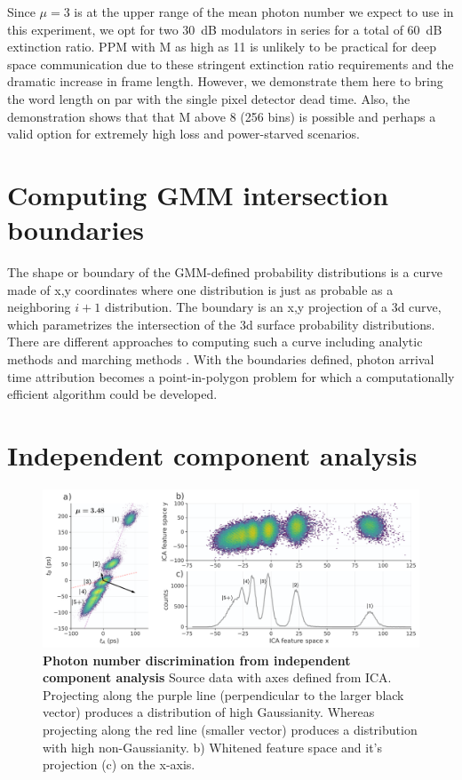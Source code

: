 \documentclass[11pt]{caltech_thesis} %
\begin{document}
Since $\mu=3$ is at the upper range of the mean photon number we expect to use in this experiment, we opt for two 30~dB modulators in series for a total of 60~dB extinction ratio. PPM with M as high as 11 is unlikely to be practical for deep space communication due to these stringent extinction ratio requirements and the dramatic increase in frame length. However, we demonstrate them here to bring the word length on par with the single pixel detector dead time. Also, the demonstration shows that that M above 8 (256 bins) is possible and perhaps a valid option for extremely high loss and power-starved scenarios.

\hypertarget{computing-gmm-intersection-boundaries}{%
\section{Computing GMM intersection boundaries}\label{computing-gmm-intersection-boundaries}}

The shape or boundary of the GMM-defined probability distributions is a curve made of x,y coordinates where one distribution is just as probable as a neighboring $i+1$ distribution. The boundary is an x,y projection of a 3d curve, which parametrizes the intersection of the 3d surface probability distributions. There are different approaches to computing such a curve including analytic methods and marching methods \autocite{Bajaj1988,Shankar1997}. With the boundaries defined, photon arrival time attribution becomes a point-in-polygon problem for which a computationally efficient algorithm could be developed.

\hypertarget{independent-component-analysis}{%
\section{Independent component analysis}\label{independent-component-analysis}}

\hypertarget{fig:ica_pnr}{%
\begin{figure}
\centering
\includegraphics[width=1\textwidth,height=\textheight]{./chapter_04/figs/ICA_component_analysis_light.pdf}
\caption[{Photon number discrimination from independent component analysis}]{\textbf{Photon number discrimination from independent component analysis} Source data with axes defined from ICA. Projecting along the purple line (perpendicular to the larger black vector) produces a distribution of high Gaussianity. Whereas projecting along the red line (smaller vector) produces a distribution with high non-Gaussianity. b) Whitened feature space and it's projection (c) on the x-axis.}
\label{fig:ica_pnr}
\end{figure}
}
\end{document}

